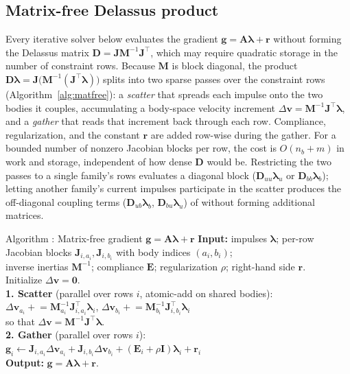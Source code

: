 \documentclass{article}
\newcounter{algctr}
\newcommand{\algcaption}[2]{\refstepcounter{algctr}\label{#2}Algorithm \thealgctr: #1}
\newcommand{\M}{\mathbf{M}}
\newcommand{\Jac}{\mathbf{J}}
\newcommand{\Del}{\mathbf{D}}         %
\newcommand{\Ecomp}{\mathbf{E}}       %
\newcommand{\Aop}{\mathbf{A}}         %
\newcommand{\vv}{\mathbf{v}}
\newcommand{\blam}{\boldsymbol{\lambda}}
\newcommand{\rhs}{\mathbf{r}}
\newcommand{\gvel}{\mathbf{g}}           %
\newcommand{\reg}{\rho}                  %
\newcommand{\Id}{\mathbf{I}}
\theoremstyle{plain}
\theoremstyle{definition}
\begin{document}
\subsection{Matrix-free Delassus product}
\label{sec:matfree}
Every iterative solver below evaluates the gradient
$\gvel=\Aop\blam+\rhs$ without forming the Delassus
matrix $\Del=\Jac\M^{-1}\Jac^{\top}$, which may require quadratic storage in
the number of constraint rows.
Because $\M$ is block diagonal, the product $\Del\blam=\Jac\bigl(\M^{-1}(\Jac^{\top}
\blam)\bigr)$ splits into two sparse passes over the constraint rows
(Algorithm~\ref{alg:matfree}): a \emph{scatter} that spreads each impulse onto the
two bodies it couples, accumulating a body-space velocity increment
$\Delta\vv=\M^{-1}\Jac^{\top}\blam$, and a \emph{gather} that reads that increment
back through each row. Compliance, regularization, and the constant $\rhs$ are
added row-wise during the gather. For a bounded number of nonzero Jacobian
blocks per row, the cost is $O(n_b+m)$ in work and storage,
independent of how dense $\Del$ would be. Restricting the two
passes to a single family's rows evaluates a diagonal block ($\Del_{uu}\blam_u$ or
$\Del_{bb}\blam_b$); letting another family's current impulses participate in the
scatter produces the off-diagonal coupling terms ($\Del_{ub}\blam_b$,
$\Del_{bu}\blam_u$) of  without forming additional matrices.

\begin{algo}{\algcaption{Matrix-free gradient $\gvel=\Aop\blam+\rhs$}{alg:matfree}}
\textbf{Input:} impulses $\blam$; per-row Jacobian blocks $\Jac_{i,a_i},\Jac_{i,b_i}$
with body indices $(a_i,b_i)$;\\
\quad inverse inertias $\M^{-1}$; compliance $\Ecomp$; regularization $\reg$;
right-hand side $\rhs$.\\
Initialize $\Delta\vv=\mathbf0$.\\
\textbf{1. Scatter} (parallel over rows $i$, atomic-add on shared bodies):\\
\quad $\Delta\vv_{a_i}\mathrel{+}=\M_{a_i}^{-1}\Jac_{i,a_i}^{\top}\blam_i$,\qquad
       $\Delta\vv_{b_i}\mathrel{+}=\M_{b_i}^{-1}\Jac_{i,b_i}^{\top}\blam_i$\\
\quad so that $\Delta\vv=\M^{-1}\Jac^{\top}\blam$.\\
\textbf{2. Gather} (parallel over rows $i$):\\
\quad $\gvel_i\leftarrow\Jac_{i,a_i}\Delta\vv_{a_i}+\Jac_{i,b_i}\Delta\vv_{b_i}
        +(\Ecomp_i+\reg\Id)\blam_i+\rhs_i$\\
\textbf{Output:} $\gvel=\Aop\blam+\rhs$.
\end{algo}
\end{document}
